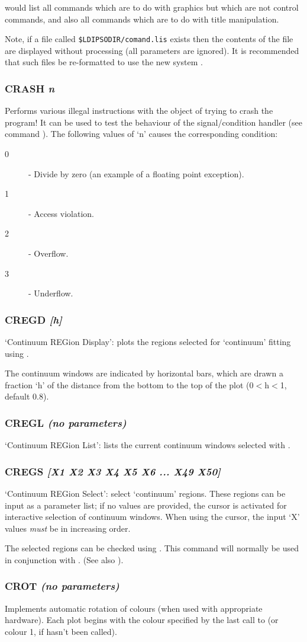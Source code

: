 \documentclass[twoside,11pt,noabs,nolof]{starlink}
\providecommand{\dipcom}[3]{\subsubsection*{\label{COM:#1}\textbf{#1} \emph{#2}}}
\newenvironment{dipdesc}{\begin{description}}{\end{description}}
\providecommand{\dipitem}[2]{ \item[{#1}] {#2} }
\begin{document}
would list all commands which are to do with graphics but which are not
control commands, and also all commands which are to do with title
manipulation.

Note, if a file called {\texttt{\$LDIPSODIR/comand\-.lis}}  exists then the
contents of the file are displayed without processing (all parameters are
ignored). It is recommended that such files be re-formatted to use the
new system .

\dipcom{CRASH}{n}{Induce an exception}
Performs various illegal instructions with the object of trying to
crash the program! It can be used to test the behaviour of the signal/condition
handler (see command ).  The following values of `n' causes the
corresponding condition:

\begin{dipdesc}
\dipitem{0}{ - Divide by zero (an example of a floating point exception).}
\dipitem{1}{ - Access violation.}
\dipitem{2}{ - Overflow.}
\dipitem{3}{ - Underflow.}
\end{dipdesc}

\dipcom{CREGD}{[h]}{plots the regions selected for 'continuum' fitting using {\texttt{CREGS}}}
`Continuum REGion Display': plots the regions selected for `continuum'
fitting using .

The continuum windows are indicated by horizontal bars, which are
drawn a fraction `h' of the distance from the bottom to the top of the
plot (0$<$h$<$1, default 0.8).

\dipcom{CREGL}{(no parameters)}{Lists the current 'continuum' window selected with {\texttt{CREGS}}}
`Continuum REGion List': lists the current continuum windows selected
with .

\dipcom{CREGS}{[X1 X2 X3 X4 X5 X6 ... X49 X50]}{Selects 'continuum' regions}
`Continuum REGion Select': select `continuum' regions. These regions
can be input as a parameter list; if no values are provided, the
cursor is activated for interactive selection of continuum windows.
When using the cursor, the input `X' values \emph{must} be in
increasing order.

The selected regions can be checked using .  This command will
normally be used in conjunction with .  (See also ).

\dipcom{CROT}{(no parameters)}{Causes automatic rotation of plotting colours}
Implements automatic rotation of colours (when used with appropriate
hardware). Each plot begins with the colour specified by the last call
to   (or colour 1, if   hasn't been called).
\end{document}
